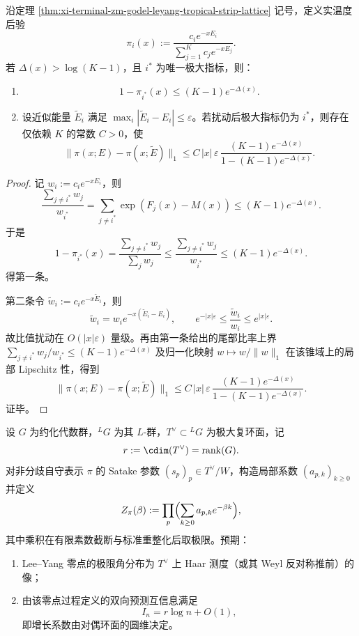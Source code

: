 \begin{corollary}\label{cor:xi-terminal-zm-leyang-strip-robustness-error-control}
沿定理 \ref{thm:xi-terminal-zm-godel-leyang-tropical-strip-lattice} 记号，定义实温度后验
\[
\pi_i(x):=\frac{c_i e^{-xE_i}}{\sum_{j=1}^K c_j e^{-xE_j}}.
\]
若 \(\Delta(x)>\log(K-1)\)，且 \(i^\ast\) 为唯一极大指标，则：
\begin{enumerate}
  \item
  \[
  1-\pi_{i^\ast}(x)\le (K-1)e^{-\Delta(x)}.
  \]
  \item 设近似能量 \(\tilde E_i\) 满足 \(\max_i |\tilde E_i-E_i|\le \varepsilon\)。若扰动后极大指标仍为 \(i^\ast\)，则存在仅依赖 \(K\) 的常数 \(C>0\)，使
  \[
  \|\pi(x;E)-\pi(x;\tilde E)\|_1
  \le
  C\,|x|\,\varepsilon\,
  \frac{(K-1)e^{-\Delta(x)}}{1-(K-1)e^{-\Delta(x)}}.
  \]
\end{enumerate}
\end{corollary}
\begin{proof}
记 \(w_i:=c_i e^{-xE_i}\)，则
\[
\frac{\sum_{j\ne i^\ast}w_j}{w_{i^\ast}}
=\sum_{j\ne i^\ast}\exp(F_j(x)-M(x))
\le (K-1)e^{-\Delta(x)}.
\]
于是
\[
1-\pi_{i^\ast}(x)
=\frac{\sum_{j\ne i^\ast}w_j}{\sum_j w_j}
\le \frac{\sum_{j\ne i^\ast}w_j}{w_{i^\ast}}
\le (K-1)e^{-\Delta(x)}.
\]
得第一条。

第二条令 \(\tilde w_i:=c_i e^{-x\tilde E_i}\)，则
\[
\tilde w_i=w_i e^{-x(\tilde E_i-E_i)},\qquad
e^{-|x|\varepsilon}\le \frac{\tilde w_i}{w_i}\le e^{|x|\varepsilon}.
\]
故比值扰动在 \(O(|x|\varepsilon)\) 量级。再由第一条给出的尾部比率上界
\(
\sum_{j\ne i^\ast}w_j/w_{i^\ast}\le (K-1)e^{-\Delta(x)}
\)
及归一化映射 \(w\mapsto w/\|w\|_1\) 在该锥域上的局部 Lipschitz 性，得到
\[
\|\pi(x;E)-\pi(x;\tilde E)\|_1
\le
C\,|x|\,\varepsilon\,
\frac{(K-1)e^{-\Delta(x)}}{1-(K-1)e^{-\Delta(x)}}.
\]
证毕。
\end{proof}

\begin{conjecture}\label{conj:xi-terminal-zm-langlands-leyang-cdim-rank-principle}
设 \(G\) 为约化代数群，\({}^LG\) 为其 \(L\)-群，\(T^\vee\subset {}^LG\) 为极大复环面，记
\[
r:=\cdim(T^\vee)=\operatorname{rank}(G).
\]
对非分歧自守表示 \(\pi\) 的 Satake 参数 \((s_p)_p\in T^\vee/W\)，构造局部系数 \((a_{p,k})_{k\ge 0}\) 并定义
\[
Z_\pi(\beta):=\prod_p\Bigl(\sum_{k\ge 0}a_{p,k}e^{-\beta k}\Bigr),
\]
其中乘积在有限素数截断与标准重整化后取极限。预期：
\begin{enumerate}
  \item Lee--Yang 零点的极限角分布为 \(T^\vee\) 上 Haar 测度（或其 Weyl 反对称推前）的像；
  \item 由该零点过程定义的双向预测互信息满足
  \[
  I_n=r\log n+O(1),
  \]
  即增长系数由对偶环面的圆维决定。
\end{enumerate}
\end{conjecture}
